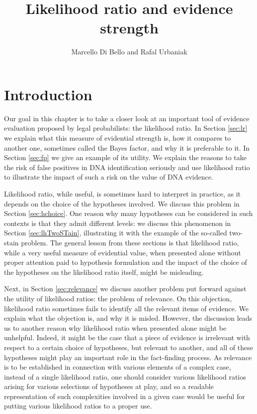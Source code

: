 \documentclass[10pt,dvipsnames,enabledeprecatedfontcommands]{scrartcl}
\title{Likelihood ratio and evidence strength}
\author{Marcello Di Bello and Rafal Urbaniak}
\date{}
\begin{document}
\maketitle

{
\hypersetup{linkcolor=black}
\setcounter{tocdepth}{2}
\tableofcontents
}
\tableofcontents

\section{Introduction}\label{introduction}

Our goal in this chapter is to take a closer look at an important tool
of evidence evaluation proposed by legal probabilists: the likelihood
ratio. In Section \ref{sec:lr} we explain what this measure of
evidential strength is, how it compares to another one, sometimes called
the Bayes factor, and why it is preferable to it. In Section
\ref{sec:fp} we give an example of its utility. We explain the reasons
to take the risk of false positives in DNA identification seriously and
use likelihood ratio to illustrate the impact of such a risk on the
value of DNA evidence.

Likelihood ratio, while useful, is sometimes hard to interpret in
practice, as it depends on the choice of the hypotheses involved. We
discuss this problem in Section \ref{sec:hchoice}. One reason why many
hypotheses can be considered in such contexts is that they admit
different levels: we discuss this phenomenon in Section
\ref{sec:lhTwoSTain}, illustrating it with the example of the so-called
two-stain problem. The general lesson from these sections is that
likelihood ratio, while a very useful measure of evidential value, when
presented alone without proper attention paid to hypothesis formulation
and the impact of the choice of the hypotheses on the likelihood ratio
itself, might be misleading.

Next, in Section \ref{sec:relevance} we discuss another problem put
forward against the utility of likelihood ratios: the problem of
relevance. On this objection, likelihood ratio sometimes fails to
identify all the relevant items of evidence. We explain what the
objection is, and why it is misled. However, the discussion leads us to
another reason why likelihood ratio when presented alone might be
unhelpful. Indeed, it might be the case that a piece of evidence is
irrelevant with respect to a certain choice of hypotheses, but relevant
to another, and all of these hypotheses might play an important role in
the fact-finding process. As relevance is to be established in
connection with various elements of a complex case, instead of a single
likelihood ratio, one should consider various likelihood ratios arising
for various selections of hypotheses at play, and so a readable
representation of such complexities involved in a given case would be
useful for putting various likelihood ratios to a proper use.
\end{document}
